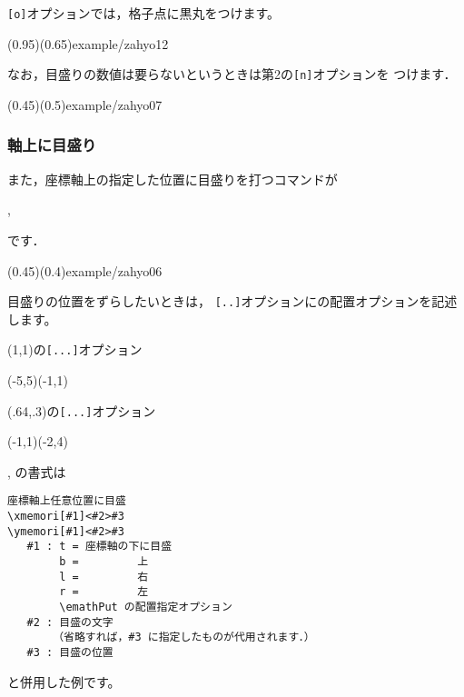 \texttt{[o]}オプションでは，格子点に黒丸をつけます。

(0.95)(0.65){example/zahyo12}

なお，目盛りの数値は要らないというときは第2の\texttt{[n]}オプションを
つけます．


\showexample[方眼](0.45)(0.5){example/zahyo07}

\subsubsection{軸上に目盛り}
また，座標軸上の指定した位置に目盛りを打つコマンドが
\begin{jquote}
, 
\end{jquote}
です．

\showexample[目盛り](0.45)(0.4){example/zahyo06}

目盛りの位置をずらしたいときは，
\verb+[..]+オプションにの配置オプションを記述します。

\begin{showEx}(1,1){の\texttt{[...]}オプション}
\begin{zahyou}[ul=10mm](-5,5)(-1,1)
\end{zahyou}
\end{showEx}

\begin{showEx}(.64,.3){の\texttt{[...]}オプション}
\begin{zahyou}[ul=10mm](-1,1)(-2,4)
\end{zahyou}
\end{showEx}

, の書式は

\begin{boxnote}
\begin{verbatim}
座標軸上任意位置に目盛
\xmemori[#1]<#2>#3
\ymemori[#1]<#2>#3
   #1 : t = 座標軸の下に目盛
        b =         上
        l =         右
        r =         左
        \emathPut の配置指定オプション
   #2 : 目盛の文字
       （省略すれば，#3 に指定したものが代用されます．）
   #3 : 目盛の位置
\end{verbatim}
\end{boxnote}

と併用した例です。


